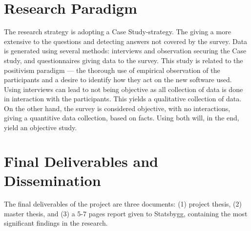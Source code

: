 \section{Research Paradigm}

The research strategy is adopting a Case Study-strategy. The  giving a more extensive to the questions and detecting answers not covered by the survey. Data is generated using several methods: interviews and observation securing the Case study, and questionnaires giving data to the survey. This study is related to the positivism paradigm — the thorough use of empirical observation of the participants and a desire to identify how they act on the new software used. Using interviews can lead to not being objective as all collection of data is done in interaction with the participants. This yields a qualitative collection of data. On the other hand, the survey is considered objective, with no interactions, giving a quantitive data collection, based on facts. Using both will, in the end, yield an objective study.

\section{Final Deliverables and Dissemination}

The final deliverables of the project are three documents: (1) project thesis, (2) master thesis, and (3) a 5-7 pages report given to Statsbygg, containing the most significant findings in the research. 

\cleardoublepage